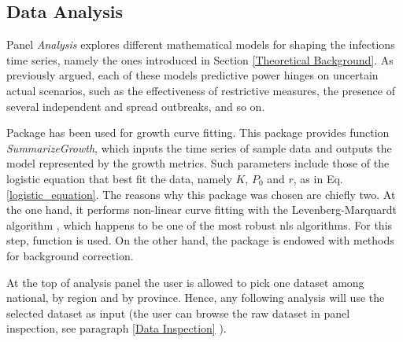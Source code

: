 \documentclass[
12pt, %
a4paper, %
oneside, %
headinclude,footinclude, %
BCOR5mm, %
]{scrartcl}
\begin{document}
\subsection{Data Analysis}

Panel \textit{Analysis} explores different mathematical models for shaping the infection\textquotesingle s time series, namely the ones introduced in Section \ref{Theoretical Background}. As previously argued, each of these model\textquotesingle s predictive power hinges on uncertain actual scenarios, such as the effectiveness of restrictive measures, the presence of several independent and spread outbreaks, and so on.

Package  \cite{growthcurver} has been used for growth curve fitting. This package provides function  \textit{SummarizeGrowth}, which inputs the time series of sample data and outputs the model represented by the growth metrics. Such parameters include those of the logistic equation that best fit the data, namely $K$, $P_0$ and $r$, as in Eq.\ref{logistic_equation}.
The reasons why this package was chosen are chiefly two. At the one hand, it performs non-linear curve fitting with the Levenberg-Marquardt algorithm \cite{more1978levenberg} , which happens to be one of the most robust nls algorithms. For this step, function \cite{nlsLM}  is used. On the other hand, the package is endowed with methods for background correction.


At the top of analysis panel the user is allowed to pick one dataset among national, by region and by province. Hence, any following analysis will use the selected dataset as input (the user can browse the raw dataset in panel inspection, see paragraph \ref{Data Inspection} ).
\end{document}
